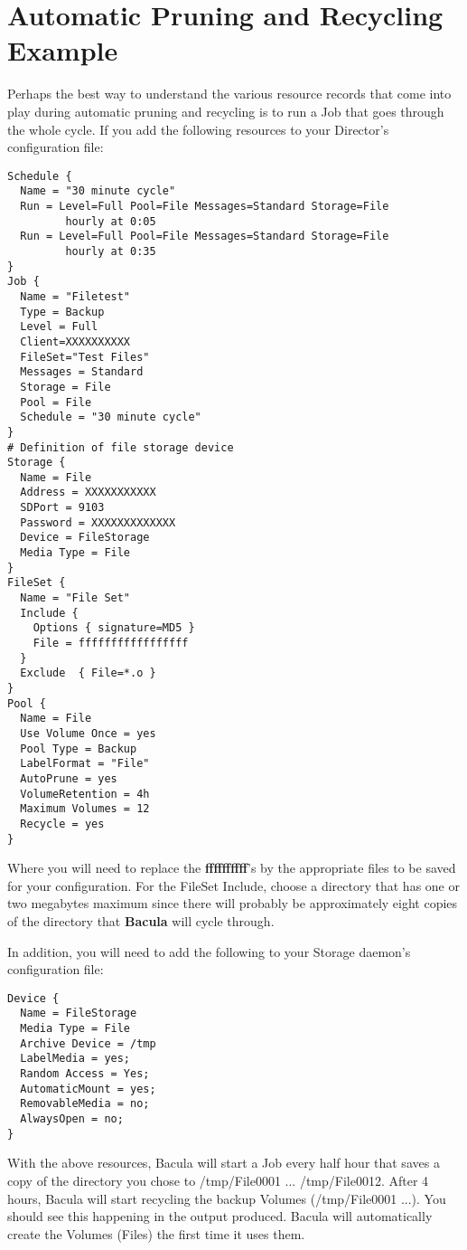 \section{ Automatic Pruning and Recycling Example}
\label{PruningExample}

Perhaps the best way to understand the various resource records that come into
play during automatic pruning and recycling is to run a Job that goes through
the whole cycle. If you add the following resources to your Director's
configuration file: 

\footnotesize
\begin{verbatim}
Schedule {
  Name = "30 minute cycle"
  Run = Level=Full Pool=File Messages=Standard Storage=File
         hourly at 0:05
  Run = Level=Full Pool=File Messages=Standard Storage=File
         hourly at 0:35
}
Job {
  Name = "Filetest"
  Type = Backup
  Level = Full
  Client=XXXXXXXXXX
  FileSet="Test Files"
  Messages = Standard
  Storage = File
  Pool = File
  Schedule = "30 minute cycle"
}
# Definition of file storage device
Storage {
  Name = File
  Address = XXXXXXXXXXX
  SDPort = 9103
  Password = XXXXXXXXXXXXX
  Device = FileStorage
  Media Type = File
}
FileSet {
  Name = "File Set"
  Include { 
    Options { signature=MD5 }
    File = fffffffffffffffff
  }
  Exclude  { File=*.o }
}
Pool {
  Name = File
  Use Volume Once = yes
  Pool Type = Backup
  LabelFormat = "File"
  AutoPrune = yes
  VolumeRetention = 4h
  Maximum Volumes = 12
  Recycle = yes
}
\end{verbatim}
\normalsize

Where you will need to replace the {\bf ffffffffff}'s by the appropriate files
to be saved for your configuration. For the FileSet Include, choose a
directory that has one or two megabytes maximum since there will probably be
approximately eight copies of the directory that {\bf Bacula} will cycle through. 

In addition, you will need to add the following to your Storage daemon's
configuration file: 

\footnotesize
\begin{verbatim}
Device {
  Name = FileStorage
  Media Type = File
  Archive Device = /tmp
  LabelMedia = yes;
  Random Access = Yes;
  AutomaticMount = yes;
  RemovableMedia = no;
  AlwaysOpen = no;
}
\end{verbatim}
\normalsize

With the above resources, Bacula will start a Job every half hour that saves a
copy of the directory you chose to /tmp/File0001 ... /tmp/File0012. After 4
hours, Bacula will start recycling the backup Volumes (/tmp/File0001 ...). You
should see this happening in the output produced. Bacula will automatically
create the Volumes (Files) the first time it uses them. 

